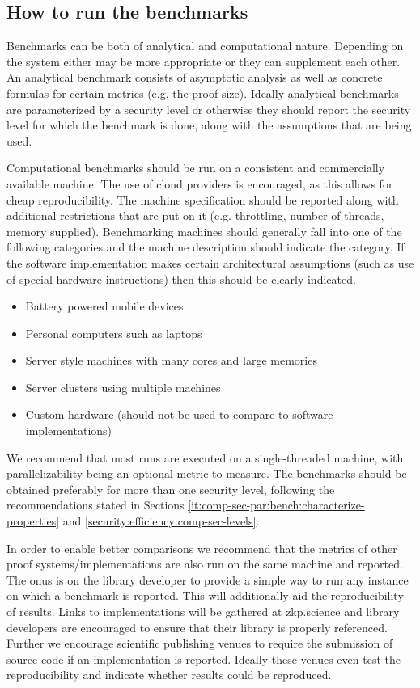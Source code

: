\subsection{How to run the benchmarks}
Benchmarks can be both of analytical and computational nature. Depending on the system either may be more appropriate or they can supplement each other. An analytical benchmark consists of asymptotic analysis as well as concrete formulas for certain metrics (e.g. the proof size). Ideally analytical benchmarks are parameterized by a security level or otherwise they should report the security level for which the benchmark is done, along with the assumptions that are being used.

Computational benchmarks should be run on a consistent and commercially available machine. The use of cloud providers is encouraged, as this allows for cheap reproducibility. The machine specification should be reported along with additional restrictions that are put on it (e.g. throttling, number of threads, memory supplied). Benchmarking machines should generally fall into one of the following categories and the machine description should indicate the category. If the software implementation makes certain architectural assumptions (such as use of special hardware instructions) then this should be clearly indicated.

\begin{itemize}
    \item Battery powered mobile devices
    \item Personal computers such as laptops
    \item Server style machines with many cores and large memories
    \item Server clusters using multiple machines 
    \item Custom hardware (should not be used to compare to software implementations)
\end{itemize}


We recommend that most runs are executed on a single-threaded machine, with parallelizability being an optional metric to measure. 
	The benchmarks should be
	obtained preferably for more than one security level, following the recommendations stated in Sections \ref{it:comp-sec-par:bench:characterize-properties} and \ref{security:efficiency:comp-sec-levels}.


In order to enable better comparisons we recommend that the metrics of other proof systems\slash implementations are also run on the same machine and reported. The onus is on the library developer to provide a simple way to run any instance on which a benchmark is reported.   This will additionally aid the reproducibility of results. Links to implementations will be gathered at zkp.science and library developers are encouraged to ensure that their library is properly referenced. Further we encourage scientific publishing venues to require the submission of source code if an implementation is reported. Ideally these venues even test the reproducibility and indicate whether results could be reproduced.


